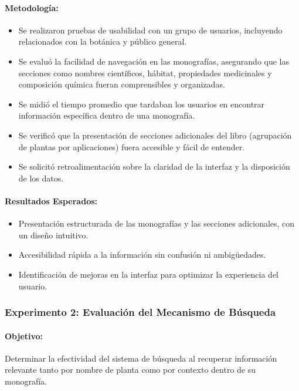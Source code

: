 \paragraph{Metodología:}
\begin{itemize}
    \item Se realizaron pruebas de usabilidad con un grupo de usuarios, incluyendo relacionados con la botánica y público general.
    \item Se evaluó la facilidad de navegación en las monografías, asegurando que las secciones como nombres científicos, hábitat, 
    propiedades medicinales y composición química fueran comprensibles y organizadas.
    \item Se midió el tiempo promedio que tardaban los usuarios en encontrar información específica dentro de una monografía.
    \item Se verificó que la presentación de secciones adicionales del libro (agrupación de plantas por aplicaciones) fuera 
    accesible y fácil de entender.
    \item Se solicitó retroalimentación sobre la claridad de la interfaz y la disposición de los datos.
\end{itemize}
\paragraph{Resultados Esperados:}
\begin{itemize}
    \item Presentación estructurada de las monografías y las secciones adicionales, con un diseño intuitivo.
    \item Accesibilidad rápida a la información sin confusión ni ambigüedades.
    \item Identificación de mejoras en la interfaz para optimizar la experiencia del usuario.
\end{itemize}

\vspace{2cm}
\subsubsection*{Experimento 2: Evaluación del Mecanismo de Búsqueda}
\paragraph{Objetivo:}
Determinar la efectividad del sistema de búsqueda al recuperar información relevante tanto por nombre de planta 
como por contexto dentro de su monografía.
